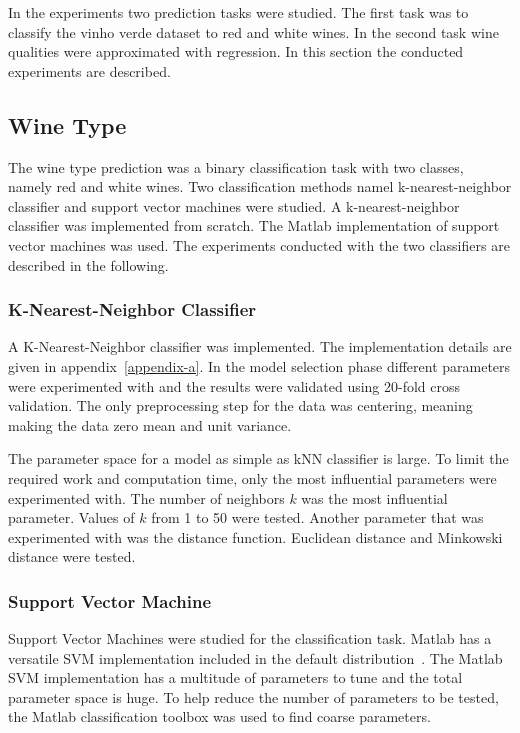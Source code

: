 \label{sec:experiments}
In the experiments two prediction tasks were studied. The first task was to classify the vinho verde dataset to red and white wines. In the second task wine qualities were approximated with regression. In this section the conducted experiments are described.

\subsection{Wine Type}
The wine type prediction was a binary classification task with two classes, namely red and white wines. Two classification methods namel k-nearest-neighbor classifier and support vector machines were studied. A k-nearest-neighbor classifier was implemented from scratch. The Matlab implementation of support vector machines was used. The experiments conducted with the two classifiers are described in the following.

\subsubsection{K-Nearest-Neighbor Classifier}
A K-Nearest-Neighbor classifier was implemented. The implementation details are given in appendix~\ref{appendix-a}. In the model selection phase different parameters were experimented with and the results were validated using 20-fold cross validation. The only preprocessing step for the data was centering, meaning making the data zero mean and unit variance.

The parameter space for a model as simple as kNN classifier is large. To limit the required work and computation time, only the most influential parameters were experimented with. The number of neighbors $k$ was the most influential parameter. Values of $k$ from 1 to 50 were tested. Another parameter that was experimented with was the distance function. Euclidean distance and Minkowski distance were tested.

\subsubsection{Support Vector Machine}
Support Vector Machines were studied for the classification task. Matlab has a versatile SVM implementation included in the default distribution~\cite{matlab:2015:fitcsvm}. The Matlab SVM implementation has a multitude of parameters to tune and the total parameter space is huge. To help reduce the number of parameters to be tested, the Matlab classification toolbox was used to find coarse parameters.

